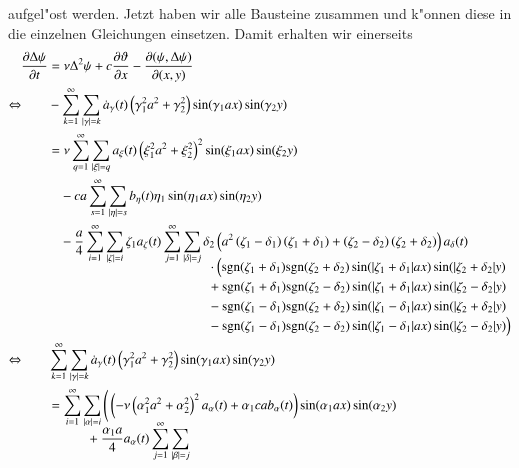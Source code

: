aufgel"ost werden. Jetzt haben wir alle Bausteine zusammen und k"onnen diese in 
die einzelnen Gleichungen einsetzen. Damit erhalten wir einerseits
\begin{align*}
\frac{\partial\Delta\psi}{\partial t}
&=
\nu\Delta^2\psi 
+c\frac{\partial\vartheta}{\partial x}
-\frac{\partial(\psi,\Delta\psi)}{\partial(x,y)}
\\
\Leftrightarrow \qquad
&-
\sum_{k = 1}^{\infty}
\sum_{|\gamma| = k}
\dot{a}_{\gamma}(t)
\left(\gamma_1^2 a^2 + \gamma_2^2 \right)
\sin(\gamma_1 ax) \sin(\gamma_2 y)
\\
&=
\nu
\sum_{q = 1}^{\infty}
\sum_{|\xi| = q}
a_{\xi}(t)
\left(\xi_1^2 a^2+\xi_2^2\right)^2
\sin(\xi_1 ax) \sin(\xi_2 y)
\\
&\phantom{={}}
-
ca
\sum_{s = 1}^{\infty}
\sum_{|\eta| = s}
b_{\eta}(t)
\eta_1
\sin(\eta_1 ax) \sin(\eta_2 y)
\\
&\phantom{={}}
-
\frac{a}{4}
\sum_{i = 1}^{\infty}
\sum_{|\zeta| = i}
\zeta_1
a_{\zeta}(t)
\sum_{j = 1}^{\infty}
\sum_{|\delta| = j}
\delta_2
\left(
a^2 \left(\zeta_1 - \delta_1 \right)\left( \zeta_1 + \delta_1 \right)
+ \left(\zeta_2 - \delta_2 \right)\left( \zeta_2 + \delta_2 \right)
\right)
a_{\delta}(t)
\\[-2ex]
&\phantom{=-abbbbb\sum\sum.....{}ccccccc}
\cdot
\Big(
\sgn(\zeta_1 + \delta_1)\sgn(\zeta_2 + \delta_2)
\sin(|\zeta_1 + \delta_1|ax)\sin(|\zeta_2 + \delta_2|y)
\\[-1ex]
&\phantom{=-abbbbb\sum\sum.....{}ccccccc}
+
\sgn(\zeta_1 + \delta_1)\sgn(\zeta_2 - \delta_2)
\sin(|\zeta_1 + \delta_1|ax)\sin(|\zeta_2 - \delta_2|y)
\\[-1ex]
&\phantom{=-abbbbb\sum\sum.....{}ccccccc}
-
\sgn(\zeta_1 - \delta_1)\sgn(\zeta_2 + \delta_2)
\sin(|\zeta_1 - \delta_1|ax)\sin(|\zeta_2 + \delta_2|y)
\\[-1ex]
&\phantom{=-abbbbb\sum\sum.....{}ccccccc}
-
\sgn(\zeta_1 - \delta_1)\sgn(\zeta_2 - \delta_2)
\sin(|\zeta_1 - \delta_1|ax)\sin(|\zeta_2 - \delta_2|y)
\Big)
\\
\Leftrightarrow \qquad
&
\sum_{k = 1}^{\infty}
\sum_{|\gamma| = k}
\dot{a}_{\gamma}(t)
\left(\gamma_1^2 a^2 + \gamma_2^2\right)
\sin(\gamma_1 ax) \sin(\gamma_2 y)
\\
&=
\sum_{i = 1}^{\infty}
\sum_{|\alpha| = i}
\Bigg(
\left(
-\nu
\left(\alpha_1^2 a^2+\alpha_2^2\right)^2
a_{\alpha}(t)
+
\alpha_1 c a
b_{\alpha}(t)
\right)
\sin(\alpha_1 ax) \sin(\alpha_2 y)
\\[-2ex]
&\phantom{=bbbb}
+
\frac{\alpha_1 a}{4}
a_{\alpha}(t)
\sum_{j = 1}^{\infty}
\sum_{|\beta| = j}

\end{align*}
